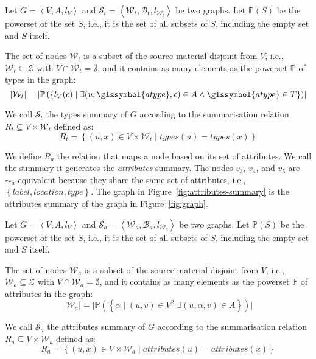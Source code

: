 \begin{definition}
	Let $G=\left\langle V, A, l_V \right\rangle$ and $\mathcal{S}_t = \left\langle \mathcal{W}_t, \mathcal{B}_t, l_{\mathcal{W}_t} \right\rangle$ be two graphs. Let $\mathbb{P}(S)$ be the powerset of the set $S$, i.e., it is the set of all subsets of $S$, including the empty set and $S$ itself.

	The set of nodes $\mathcal{W}_t$ is a subset of the source material disjoint from $V$, i.e., $\mathcal{W}_t \subseteq \mathcal{Z}$ with $V \cap \mathcal{W}_t = \emptyset$, and it contains as many elements as the powerset $\mathbb{P}$ of types in the graph:
	$$
	\lvert \mathcal{W}_t \rvert = \lvert \mathbb{P}\left( \left\lbrace l_V(c) \mid \exists (u, \glssymbol{atype}, c) \in A \wedge \glssymbol{atype} \in T \right\rbrace \right) \rvert
	$$

	We call $\mathcal{S}_t$ the types summary of $G$ according to the summarisation relation $R_t \subseteq V \times \mathcal{W}_t$ defined as:
	$$
	R_t = \left\lbrace (u, x) \in V \times \mathcal{W}_t \mid types(u) = types(x) \right\rbrace
	$$
	\label{def:t}
\end{definition}
\vspace{.5cm}


We define $R_a$ the relation that maps a node based on its set of attributes. We call the summary it generates the \emph{attributes} summary.
The nodes $v_3$, $v_4$, and $v_5$ are $\sim_a$-equivalent because they share the same set of attributes, i.e., $\left\lbrace label, location, type \right\rbrace$. The graph in Figure~\ref{fig:attributes-summary} is the attributes summary of the graph in Figure~\ref{fig:graph}.

\begin{definition}
	Let $G=\left\langle V, A, l_V \right\rangle$ and $\mathcal{S}_a = \left\langle \mathcal{W}_a, \mathcal{B}_a, l_{\mathcal{W}_a} \right\rangle$ be two graphs. Let $\mathbb{P}(S)$ be the powerset of the set $S$, i.e., it is the set of all subsets of $S$, including the empty set and $S$ itself.

	The set of nodes $\mathcal{W}_a$ is a subset of the source material disjoint from $V$, i.e., $\mathcal{W}_a \subseteq \mathcal{Z}$ with $V \cap \mathcal{W}_a = \emptyset$, and it contains as many elements as the powerset $\mathbb{P}$ of attributes in the graph:
	$$
	\lvert \mathcal{W}_a \rvert = \lvert \mathbb{P}\left( \left\lbrace \alpha \mid (u, v) \in V^2\; \exists (u, \alpha, v) \in A \right\rbrace \right) \rvert
	$$

	We call $\mathcal{S}_a$ the attributes summary of $G$ according to the summarisation relation $R_a \subseteq V \times \mathcal{W}_a$ defined as:
	$$
	R_a = \left\lbrace (u, x) \in V \times \mathcal{W}_a \mid attributes(u) = attributes(x) \right\rbrace
	$$
	\label{def:a}
\end{definition}

